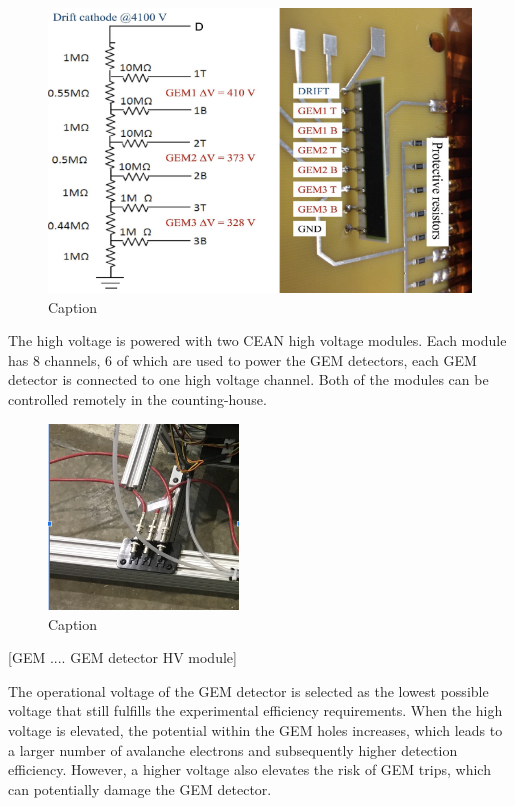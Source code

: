 \begin{figure}
    \centering
    \includegraphics[width=\textwidth]{images/chap3/GEM_register_chain.png}
    \caption{Caption}
    \label{fig:enter-label}
\end{figure}


The high voltage is powered with two CEAN high voltage modules. Each module has 8 channels, 6 of which are used to power the GEM detectors, each GEM detector is connected to one high voltage channel.  Both of the modules can be controlled remotely in the counting-house. 

\begin{figure}[!htbp]
    \centering
    \includegraphics[width=0.45\textwidth]{images/chap3/gem_hv_connector.png}
    \caption{Caption}
    \label{fig:enter-label}
\end{figure}

[GEM .... GEM detector HV module]


The operational voltage of the GEM detector is selected as the lowest possible voltage that still fulfills the experimental efficiency requirements. When the high voltage is elevated, the potential within the GEM holes increases, which leads to a larger number of avalanche electrons and subsequently higher detection efficiency. However, a higher voltage also elevates the risk of GEM trips, which can potentially damage the GEM detector.

